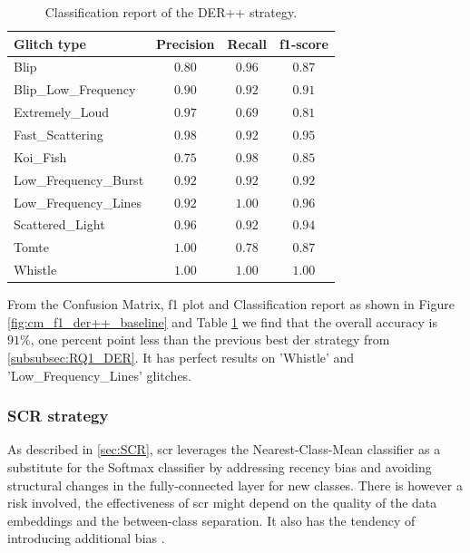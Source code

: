 \begin{table}[ht]
\centering
    \begin{tabular}{|l|c c c|}
    \hline
    \textbf{Glitch type} & \textbf{Precision} & \textbf{Recall} & \textbf{f1-score} \\ \hline
    Blip & $0.80$ & $0.96$ & $0.87$ \\
    Blip\_Low\_Frequency & $0.90$ & $0.92$ & $0.91$\\
    Extremely\_Loud & $0.97$ & $0.69$ &  $0.81$\\
    Fast\_Scattering & $0.98$ & $0.92$ &  $0.95$\\
    Koi\_Fish & $0.75$ & $0.98$ & $0.85$\\
    Low\_Frequency\_Burst & $0.92$ & $0.92$ & $0.92$\\
    Low\_Frequency\_Lines & $0.92$ & $1.00$ & $0.96$\\
    Scattered\_Light & $0.96$ & $0.92$ & $0.94$ \\
    Tomte & $1.00$ & $0.78$ & $0.87$ \\
    Whistle & $1.00$ & $1.00$ & $1.00$ \\
    \hline
    \end{tabular}
    \caption{Classification report of the DER++ strategy.}
    \label{tbl:RQ1_class_report_der++}
\end{table}

From the Confusion Matrix, f1 plot and Classification report as shown in Figure \ref{fig:cm_f1_der++_baseline} and Table \ref{tbl:RQ1_class_report_der++} we find that the overall accuracy is $91\%$, one percent point less than the previous best \acrshort{der} strategy from \ref{subsubsec:RQ1_DER}. It has perfect results on 'Whistle' and 'Low\_Frequency\_Lines' glitches. \\

\newpage
\subsubsection{SCR strategy}
\label{subsub:RQ1_SCR}
As described in \ref{sec:SCR}, \acrshort{scr} leverages the Nearest-Class-Mean classifier as a substitute for the Softmax classifier by addressing recency bias and avoiding structural changes in the fully-connected layer for new classes. There is however a risk involved, the effectiveness of \acrshort{scr} might depend on the quality of the data embeddings and the between-class separation. It also has the tendency of introducing additional bias \citep{mai2021supervised, aleixo2023catastrophic}.   

